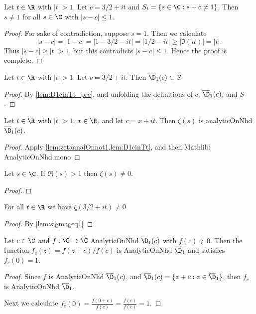 \begin{lemma}\label{lem:D1cinTt_pre}
\leanok
Let $t\in\R$  with $|t|>1$. Let $c=3/2+it$ and $S_t=\{s\in\C : s+c\neq 1\}$. Then $s\neq1$ for all $s\in\C$ with $|s-c|\le 1$.
\end{lemma}
\begin{proof}
\leanok
For sake of contradiction, suppose $s=1$. Then we calculate $$|s-c|=|1-c| = |1-3/2-it|=|1/2-it|\ge |\Im(it)| = |t|.$$
Thus $|s-c| \ge |t|>1$, but this contradicts $|s-c|\le 1$. Hence the proof is complete.
\end{proof}

\begin{lemma}\label{lem:D1cinTt}
\leanok
Let $t\in\R$ with $|t|>1$. Let $c=3/2+it$. Then $\overline{\D}_1(c) \subset S$
\end{lemma}
\begin{proof}
\leanok
{}
By \cref{lem:D1cinTt_pre}, and unfolding the definitions of $c$, $\overline{\D}_1(c)$,  and $S$.
\end{proof}

\begin{lemma}\label{lem:zetaanalOnD1c}
\leanok
Let $t\in\R$ with $|t|>1$, $x \in \R$, and let $c=x+it$. Then $\zeta(s)$ is analyticOnNhd $\overline{\D}_1(c)$.
\end{lemma}
\begin{proof}
\leanok
{}
Apply \cref{lem:zetaanalOnnot1,lem:D1cinTt}, and then Mathlib: AnalyticOnNhd.mono
\end{proof}


\begin{lemma}\label{lem:sigmageq1}
\leanok
Let $s\in\C$. If $\Re(s) > 1$ then $\zeta(s) \neq0 $.
\end{lemma}
\begin{proof}
\leanok
\end{proof}

\begin{lemma}\label{lem:zetacnot0}
\leanok
For all $t\in\R$ we have $\zeta(3/2+it)\neq0$
\end{lemma}
\begin{proof}
\leanok
{}
By \cref{lem:sigmageq1}
\end{proof}


\begin{lemma} \label{lem:fc_analytic_normalized}  \leanok
Let $c\in\C$ and $f:\C\to\C$ AnalyticOnNhd $\overline{\D}_1(c)$ with $f(c)\neq 0$. Then the function $f_c(z) = f(z+c)/f(c)$ is AnalyticOnNhd $\overline{\D}_1$ and satisfies $f_c(0)=1$.
\end{lemma}
\begin{proof}
\leanok
Since $f$ is AnalyticOnNhd $\overline{\D}_1(c)$, and $\overline{\D}_1(c)=\{z+c:z\in \overline{\D}_1\}$, then $f_c$ is AnalyticOnNhd $\overline{\D}_1$.

Next we calculate $f_c(0) = \frac{f(0+c)}{f(c)} = \frac{f(c)}{f(c)} = 1.$
\end{proof}


